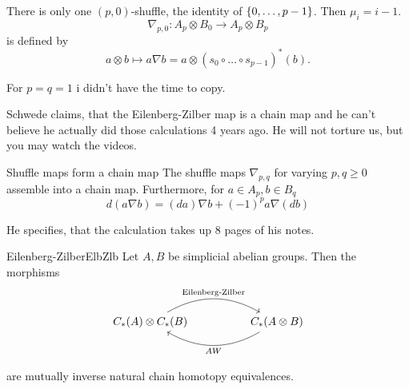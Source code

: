 \documentclass[language=english]{TemplateLecture}
\begin{document}
\begin{example}
    There is only one \((p,0)\)-shuffle, the identity of \(\{0, \dots, p-1\}\). Then \(\mu_i = i-1\).
    \[\nabla_{p,0}\colon A_p \otimes B_0 \to A_p \otimes B_p\]
    is defined by
    \[a\otimes b \mapsto a\nabla b = a \otimes (s_0 \circ \dots \circ s_{p-1})^*(b).\]

    For \(p = q = 1\) i didn't have the time to copy.
\end{example}

Schwede claims, that the Eilenberg-Zilber map is a chain map and he can't believe he actually did those calculations 4 years ago. He will not torture us, but you may watch the videos.

\begin{thm}{Shuffle maps form a chain map}{}
    The shuffle maps \(\nabla_{p,q}\) for varying \(p,q \geq 0\) assemble into a chain map. Furthermore, for \(a \in A_p, b \in B_q\)
    \[d(a\nabla b) = (da) \nabla b + (-1)^p a \nabla (db)\]
\end{thm}

He specifies, that the calculation takes up 8 pages of his notes.


\begin{thm}{Eilenberg-Zilber}{ElbZlb}
    Let \(A,B\) be simplicial abelian groups. Then the morphisms
    \[\begin{tikzcd}
        C_*(A) \otimes C_*(B) \ar[rr, bend left, "\text{Eilenberg-Zilber}"] && C_*(A\otimes B) \ar[ll, bend left, "AW"]
    \end{tikzcd}\]

    are mutually inverse natural chain homotopy equivalences.
\end{thm}
\end{document}
